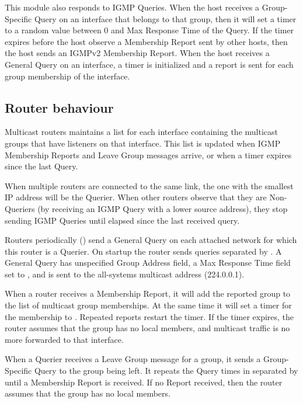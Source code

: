 This module also responds to IGMP Queries. When the host
receives a Group-Specific Query on an interface that belongs
to that group, then it will set a timer to a random value
between 0 and Max Response Time of the Query. If the timer
expires before the host observe a Membership Report sent
by other hosts, then the host sends an IGMPv2 Membership Report.
When the host receives a General Query on an interface,
a timer is initialized and a report is sent for each group
membership of the interface.

\subsection*{Router behaviour}

Multicast routers maintains a list for each interface containing
the multicast groups that have listeners on that interface.
This list is updated when IGMP Membership Reports and Leave Group
messages arrive, or when a timer expires since the last Query.

When multiple routers are connected to the same link, the one with
the smallest IP address will be the Querier. When other routers
observe that they are Non-Queriers (by receiving an IGMP Query
with a lower source address), they stop sending IGMP Queries
until  elapsed since the last
received query.

Routers periodically () send a General Query
on each attached network for which this router is a Querier.
On startup the router sends  queries
separated by . A General Query
has unspecified Group Address field, a Max Response Time
field set to , and is sent to the
all-systems multicast address (224.0.0.1).

When a router receives a Membership Report, it will add the
reported group to the list of multicast group memberships.
At the same time it will set a timer for the membership
to . Repeated reports restart
the timer. If the timer expires, the router assumes
that the group has no local members, and multicast traffic
is no more forwarded to that interface.

When a Querier receives a Leave Group message for a group,
it sends a Group-Specific Query to the group being left.
It repeats the Query  times in
separated by  until a Membership
Report is received. If no Report received, then the router
assumes that the group has no local members.

